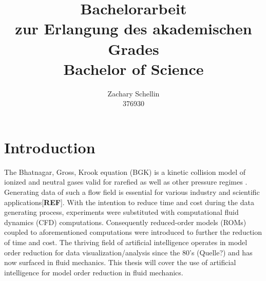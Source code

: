 \documentclass[12pt, a4paper]{article}
\begin{document}
\title{Bachelorarbeit\\ zur Erlangung des akademischen Grades\\ Bachelor of Science}
\author{Zachary Schellin\\376930}
\noindent
\maketitle
\newpage
\tableofcontents
\newpage
\section{Introduction}
The Bhatnagar, Gross, Krook equation (BGK) is a kinetic collision model of ionized and neutral gases valid for rarefied as well as other pressure regimes \cite{BGK}. Generating data of such a flow field is essential for various industry and scientific applications[\textbf{REF}]. With the intention to reduce time and cost during the data generating process, experiments were substituted with computational fluid dynamics (CFD) computations. Consequently reduced-order models (ROMs) coupled to aforementioned computations were introduced to further the reduction of time and cost. The thriving field of artificial intelligence operates in model order reduction for data visualization/analysis since the 80's (Quelle?)  and has now surfaced in fluid mechanics. This thesis will cover the use of artificial intelligence for model order reduction in fluid mechanics.
\end{document}
